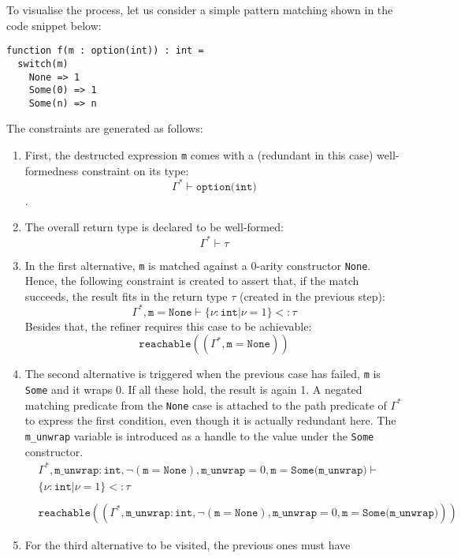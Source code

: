 To visualise the process, let us consider a simple pattern matching shown in the
code snippet below:

\begin{lstlisting}[language=sophia]
function f(m : option(int)) : int =
  switch(m)
    None => 1
    Some(0) => 1
    Some(n) => n
\end{lstlisting}

The constraints are generated as follows:

\begin{enumerate}
\item First, the destructed expression \texttt{m} comes with a (redundant in
  this case) well-formedness constraint on its type:
  $$\Gamma^* \vdash \texttt{option(int)}$$.
\item The overall return type is declared to be well-formed:
  $$\Gamma^* \vdash \tau$$
\item In the first alternative, \texttt{m} is matched against a 0-arity
  constructor \texttt{None}. Hence, the following constraint is created to
  assert that, if the match succeeds, the result fits in the return type
  $\tau$ (created in the previous step):
  $$\Gamma^*, \texttt{m} = \texttt{None} \vdash \{\nu : \texttt{int} | \nu = 1\}
  <: \tau$$ Besides that, the refiner requires this case to be
  achievable:
  $$\texttt{reachable}((\Gamma^*, \texttt{m} = \texttt{None}))$$
\item The second alternative is triggered when the previous case has failed,
  \texttt{m} is \texttt{Some} and it wraps 0. If all these hold, the result is
  again 1. A negated matching predicate from the \texttt{None} case is attached
  to the path predicate of $\Gamma^*$ to express the first condition, even
  though it is actually redundant here. The \texttt{m\_unwrap} variable is
  introduced as a handle to the value under the \texttt{Some} constructor.
  \begin{align*}
    & \Gamma^*, \texttt{m\_unwrap} : \texttt{int}, \lnot(\texttt{m} = \texttt{None}), \texttt{m\_unwrap} = 0, \texttt{m} = \texttt{Some(m\_unwrap)} \vdash\\
    & \{\nu : \texttt{int} | \nu = 1\} <: \tau\\
    & \\
    & \texttt{reachable}((\Gamma^*, \texttt{m\_unwrap} : \texttt{int}, \lnot(\texttt{m} = \texttt{None}), \texttt{m\_unwrap} = 0, \texttt{m} = \texttt{Some(m\_unwrap)}))
  \end{align*}
\item For the third alternative to be visited, the previous ones must have

\end{enumerate}
